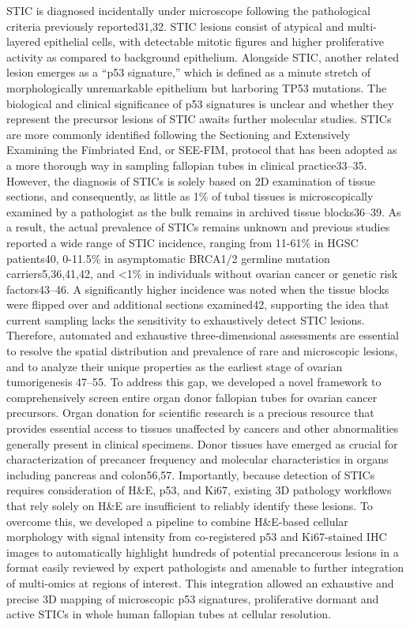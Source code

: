 \begin{refsection}
    STIC is diagnosed incidentally under microscope following the pathological criteria previously reported31,32. STIC lesions consist of atypical and multi-layered epithelial cells, with detectable mitotic figures and higher proliferative activity as compared to background epithelium. Alongside STIC, another related lesion emerges as a “p53 signature,” which is defined as a minute stretch of morphologically unremarkable epithelium but harboring TP53 mutations. The biological and clinical significance of p53 signatures is unclear and whether they represent the precursor lesions of STIC awaits further molecular studies. STICs are more commonly identified following the Sectioning and Extensively Examining the Fimbriated End, or SEE-FIM, protocol that has been adopted as a more thorough way in sampling fallopian tubes in clinical practice33–35. However, the diagnosis of STICs is solely based on 2D examination of tissue sections, and consequently, as little as 1\% of tubal tissues is microscopically examined by a pathologist as the bulk remains in archived tissue blocks36–39. As a result, the actual prevalence of STICs remains unknown and previous studies reported a wide range of STIC incidence, ranging from 11-61\% in HGSC patients40, 0-11.5\% in asymptomatic BRCA1/2 germline mutation carriers5,36,41,42, and <1\% in individuals without ovarian cancer or genetic risk factors43–46.  A significantly higher incidence was noted when the tissue blocks were flipped over and additional sections examined42, supporting the idea that current sampling lacks the sensitivity to exhaustively detect STIC lesions. Therefore, automated and exhaustive three-dimensional assessments are essential to resolve the spatial distribution and prevalence of rare and microscopic lesions, and to analyze their unique properties as the earliest stage of ovarian tumorigenesis 47–55.
    To address this gap, we developed a novel framework to comprehensively screen entire organ donor fallopian tubes for ovarian cancer precursors. Organ donation for scientific research is a precious resource that provides essential access to tissues unaffected by cancers and other abnormalities generally present in clinical specimens. Donor tissues have emerged as crucial for characterization of precancer frequency and molecular characteristics in organs including pancreas and colon56,57. Importantly, because detection of STICs requires consideration of H\&E, p53, and Ki67, existing 3D pathology workflows that rely solely on H\&E are insufficient to reliably identify these lesions. To overcome this, we developed a pipeline to combine H\&E-based cellular morphology with signal intensity from co-registered p53 and Ki67-stained IHC images to automatically highlight hundreds of potential precancerous lesions in a format easily reviewed by expert pathologists and amenable to further integration of multi-omics at regions of interest. This integration allowed an exhaustive and precise 3D mapping of microscopic p53 signatures, proliferative dormant and active STICs in whole human fallopian tubes at cellular resolution.

\end{refsection}
